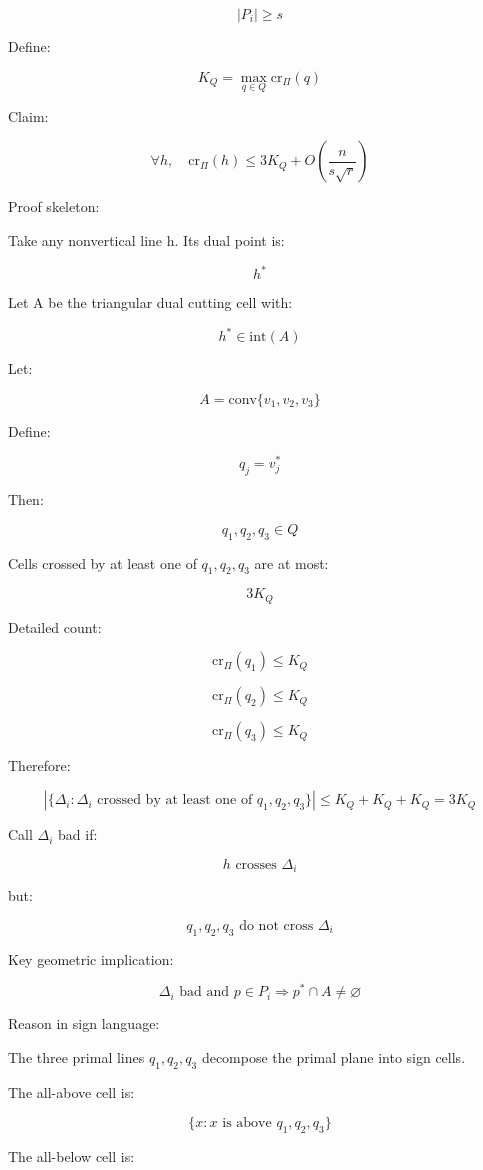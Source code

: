 \documentclass[
  11pt,
]{article}
\begin{document}
\[
|P_i|\ge s
\]

Define:

\[
K_Q=\max_{q\in Q}\mathrm{cr}_\Pi(q)
\]

Claim:

\[
\forall h,\quad \mathrm{cr}_\Pi(h) \le 3K_Q + O\left(\frac{n}{s\sqrt r}\right)
\]

Proof skeleton:

Take any nonvertical line h. Its dual point is:

\[
h^\ast 
\]

Let A be the triangular dual cutting cell with:

\[
h^\ast \in\mathrm{int}(A)
\]

Let:

\[
A=\mathrm{conv}\lbrace v_1,v_2,v_3 \rbrace
\]

Define:

\[
q_j=v_j^\ast 
\]

Then:

\[
q_1,q_2,q_3\in Q
\]

Cells crossed by at least one of \(q_1,q_2,q_3\) are at most:

\[
3K_Q
\]

Detailed count:

\[
\mathrm{cr}_\Pi(q_1)\le K_Q
\]

\[
\mathrm{cr}_\Pi(q_2)\le K_Q
\]

\[
\mathrm{cr}_\Pi(q_3)\le K_Q
\]

Therefore:

\[
|\lbrace \Delta_i:\Delta_i\text{ crossed by at least one of }q_1,q_2,q_3 \rbrace| \le K_Q+K_Q+K_Q = 3K_Q
\]

Call \(\Delta_i\) bad if:

\[
h\text{ crosses }\Delta_i
\]

but:

\[
q_1,q_2,q_3\text{ do not cross }\Delta_i
\]

Key geometric implication:

\[
\Delta_i\text{ bad and }p\in P_i \Longrightarrow p^\ast \cap A\ne\varnothing
\]

Reason in sign language:

The three primal lines \(q_1,q_2,q_3\) decompose the primal plane into
sign cells.

The all-above cell is:

\[
\lbrace x:x\text{ is above }q_1,q_2,q_3 \rbrace
\]

The all-below cell is:
\end{document}
